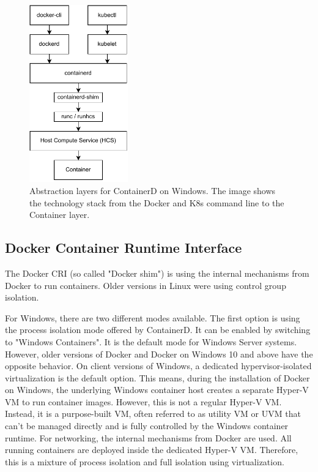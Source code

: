 \begin{figure}[h]
	\centering
	\includegraphics[width=0.38\textwidth]{Figures/containerd-architecture.pdf}
	\caption{Abstraction layers for ContainerD on Windows. The image shows the technology stack from the Docker and \ac{K8s} command line to the Container layer.\cite{Scooley.2022}}
	\label{fig.containerd-architecture}
\end{figure}


\subsection{Docker Container Runtime Interface}
The Docker \ac{CRI} (so called "Docker shim") is using the internal mechanisms from Docker to run containers. Older versions in Linux were using control group isolation.

For \ac{Windows}, there are two different modes available. The first option is using the process isolation mode offered by ContainerD. It can be enabled by switching to "\ac{Windows} Containers". It is the default mode for Windows Server systems. However, older versions of Docker and Docker on Windows 10 and above have the opposite behavior\cite{RamosApolinario.2021}. On client versions of Windows, a dedicated hypervisor-isolated virtualization is the default option\cite{RamosApolinario.2021}. This means, during the installation of Docker on \ac{Windows}, the underlying Windows container host creates a separate Hyper-V \ac{VM} to run container images. However, this is not a regular Hyper-V \ac{VM}. Instead, it is a purpose-built \ac{VM}, often referred to as utility \ac{VM} or UVM that can't be managed directly and is fully controlled by the \ac{Windows} container runtime\cite{RamosApolinario.2021}. For networking, the internal mechanisms from Docker are used. All running containers are deployed inside the dedicated Hyper-V \ac{VM}. Therefore, this is a mixture of process isolation and full isolation using virtualization.

